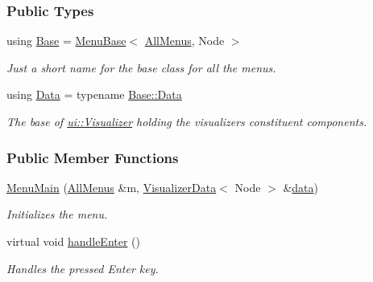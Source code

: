 \subsubsection*{Public Types}
\begin{DoxyCompactItemize}
\item 
using \hyperlink{structMenuMain_a12b9659db848d295be786bfabccddfd1}{Base} = \hyperlink{structMenuBase}{Menu\+Base}$<$ \hyperlink{structAllMenus}{All\+Menus}, Node $>$\hypertarget{structMenuMain_a12b9659db848d295be786bfabccddfd1}{}\label{structMenuMain_a12b9659db848d295be786bfabccddfd1}

\begin{DoxyCompactList}\small\item\em Just a short name for the base class for all the menus. \end{DoxyCompactList}\item 
using \hyperlink{structMenuMain_af17067b46d955b4361a9ab652d836cf5}{Data} = typename \hyperlink{structMenuBase_a473a45fd8adbc75a9220b64753ae3837}{Base\+::\+Data}\hypertarget{structMenuMain_af17067b46d955b4361a9ab652d836cf5}{}\label{structMenuMain_af17067b46d955b4361a9ab652d836cf5}

\begin{DoxyCompactList}\small\item\em The base of \hyperlink{structui_1_1Visualizer}{ui\+::\+Visualizer} holding the visualizer\textquotesingle{}s constituent components. \end{DoxyCompactList}\end{DoxyCompactItemize}
\subsubsection*{Public Member Functions}
\begin{DoxyCompactItemize}
\item 
\hyperlink{structMenuMain_a32fbce0abe9dd247b428898668d6598c}{Menu\+Main} (\hyperlink{structAllMenus}{All\+Menus} \&m, \hyperlink{structVisualizerData}{Visualizer\+Data}$<$ Node $>$ \&\hyperlink{structMenuBase_a819aaaa06ede3bffbb12c1390657ef64}{data})
\begin{DoxyCompactList}\small\item\em Initializes the menu. \end{DoxyCompactList}\item 
virtual void \hyperlink{structMenuMain_aeb28f16f1526c04a9f7514a3a8f7f756}{handle\+Enter} ()\hypertarget{structMenuMain_aeb28f16f1526c04a9f7514a3a8f7f756}{}\label{structMenuMain_aeb28f16f1526c04a9f7514a3a8f7f756}

\begin{DoxyCompactList}\small\item\em Handles the pressed Enter key. \end{DoxyCompactList}\end{DoxyCompactItemize}
